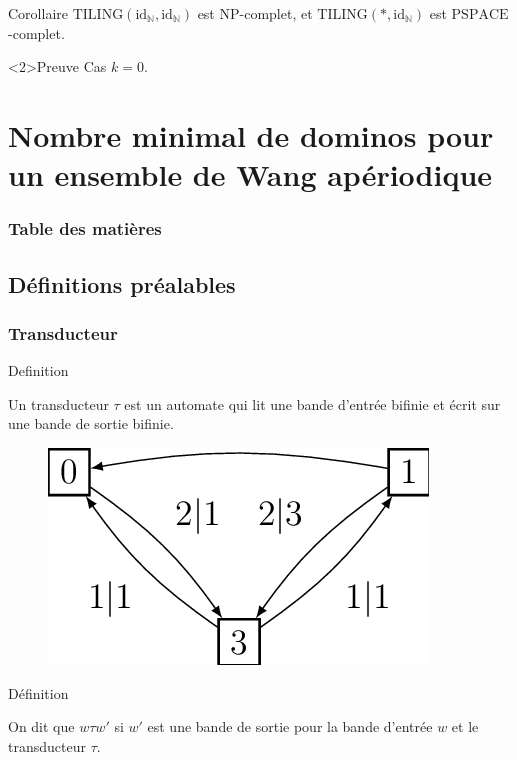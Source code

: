 \documentclass{beamer}
\newcommand{\N}{\mathbb N}
\newcommand{\id}{\mathrm{id}}
\begin{document}
    \begin{frame}
        
    \begin{block}{Corollaire}
        $\mathrm{TILING}(\id_\N,\id_\N)$ est $\mathrm{NP}$-complet, et $\mathrm{TILING}(*,\id_\N)$ est $\mathrm{PSPACE}$-complet.
    \end{block}
    
    \begin{exampleblock}<2>{Preuve}
        Cas $k=0$.
    \end{exampleblock}
    
    \end{frame}

\section{Nombre minimal de dominos pour un ensemble de Wang apériodique}

\begin{frame}
    \frametitle{Table des matières}
    \tableofcontents[currentsection]
  \end{frame}

\subsection{Définitions préalables}

\begin{frame}
\frametitle{Transducteur}

\begin{alertblock}{Definition}

Un transducteur $\tau$ est un automate qui lit une bande d'entrée bifinie et écrit sur une bande de sortie bifinie.
    
\end{alertblock}

\begin{figure}

    \includegraphics[scale = 1]{transducteur_exemple}
    \centering
    
\end{figure}

\begin{alertblock}{Définition}

On dit que $w \tau w'$ si $w'$ est une bande de sortie pour la bande d'entrée $w$ et le transducteur $\tau$.
    
\end{alertblock}

\end{frame}
\end{document}
